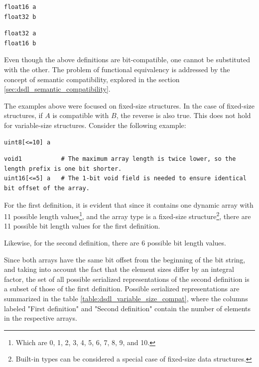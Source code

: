 \begin{verbatim}
float16 a
float32 b
\end{verbatim}

\begin{verbatim}
float32 a
float16 b
\end{verbatim}

Even though the above definitions are bit-compatible, one cannot be substituted with the other.
The problem of functional equivalency is addressed by the concept of semantic compatibility,
explored in the section \ref{sec:dsdl_semantic_compatibility}.

The examples above were focused on fixed-size structures.
In the case of fixed-size structures, if $A$ is compatible with $B$, the reverse is also true.
This does not hold for variable-size structures.
Consider the following example:

\begin{verbatim}
uint8[<=10] a
\end{verbatim}

\begin{verbatim}
void1           # The maximum array length is twice lower, so the length prefix is one bit shorter.
uint16[<=5] a   # The 1-bit void field is needed to ensure identical bit offset of the array.
\end{verbatim}

For the first definition, it is evident that since it contains one dynamic array with
11 possible length values\footnote{Which are 0, 1, 2, 3, 4, 5, 6, 7, 8, 9, and 10.},
and the array type is a fixed-size
structure\footnote{Built-in types can be considered a special case of fixed-size data structures.},
there are 11 possible bit length values for the first definition.

Likewise, for the second definition, there are 6 possible bit length values.

Since both arrays have the same bit offset from the beginning of the bit string,
and taking into account the fact that the element sizes differ by an integral factor,
the set of all possible serialized representations of the second definition is a subset of those of
the first definition.
Possible serialized representations are summarized in the table \ref{table:dsdl_variable_size_compat},
where the columns labeled "First definition" and "Second definition" contain the number of elements in the
respective arrays.

